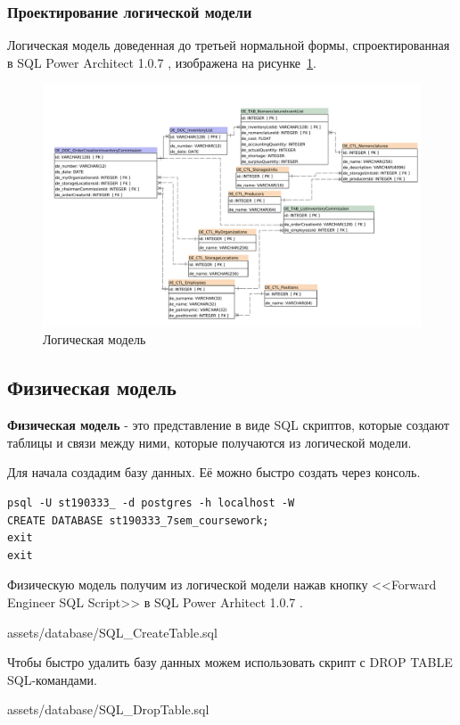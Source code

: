 
\subsubsection{Проектирование логической модели}

Логическая модель доведенная до третьей нормальной формы,
спроектированная в SQL Power Architect 1.0.7 \cite{SqlPowerArhitect},
изображена на рисунке~\ref{fig:ArchitectureDatabase}.

\begin{figure}[!h]
    \centering

    \includegraphics[width=18cm]
    {assets/database/LogicModel.SqlPowerArchitect.architect.pdf}

    \caption{Логическая модель}

    \label{fig:ArchitectureDatabase}
\end{figure}

\newpage
\subsection{Физическая модель}

\textbf{Физическая модель} - это представление в виде SQL скриптов, которые создают таблицы и связи между ними,
которые получаются из логической модели.

Для начала создадим базу данных. Её можно быстро создать через консоль.

\begin{lstlisting}[name=Создание базы данных в Postgres]
psql -U st190333_ -d postgres -h localhost -W
CREATE DATABASE st190333_7sem_coursework;
exit
exit
\end{lstlisting}

Физическую модель получим из логической модели нажав кнопку <<Forward Engineer SQL Script>>
в SQL Power Arhitect 1.0.7 \cite{SqlPowerArhitect}.


{assets/database/SQL_CreateTable.sql}

Чтобы быстро удалить базу данных можем использовать скрипт с DROP TABLE SQL-командами.


{assets/database/SQL_DropTable.sql}

\newpage
